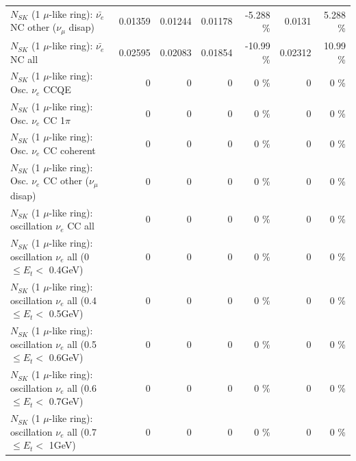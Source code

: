 \begin{table}
\begin{tabular}{| l | r | r | r  r | r  r |}
          $N_{SK}$ (1 $\mu$-like ring): $\bar{\nu_e}$ NC other ($\nu_\mu$ disap) &         0.01359 &         0.01244 &         0.01178 &   -5.288 \%  &          0.0131 &    5.288 \%  \\ 
                            $N_{SK}$ (1 $\mu$-like ring): $\bar{\nu_{e}}$ NC all &         0.02595 &         0.02083 &         0.01854 &   -10.99 \%  &         0.02312 &    10.99 \%  \\ 
\hline
\hline
\hline
                                 $N_{SK}$ (1 $\mu$-like ring): Osc. $\nu_e$ CCQE &               0 &               0 &               0 &        0 \%  &               0 &        0 \%  \\ 
                            $N_{SK}$ (1 $\mu$-like ring): Osc. $\nu_e$ CC 1$\pi$ &               0 &               0 &               0 &        0 \%  &               0 &        0 \%  \\ 
                          $N_{SK}$ (1 $\mu$-like ring): Osc. $\nu_e$ CC coherent &               0 &               0 &               0 &        0 \%  &               0 &        0 \%  \\ 
           $N_{SK}$ (1 $\mu$-like ring): Osc. $\nu_e$ CC other ($\nu_\mu$ disap) &               0 &               0 &               0 &        0 \%  &               0 &        0 \%  \\ 
                        $N_{SK}$ (1 $\mu$-like ring): oscillation $\nu_e$ CC all &               0 &               0 &               0 &        0 \%  &               0 &        0 \%  \\ 
\hline
$N_{SK}$ (1 $\mu$-like ring): oscillation $\nu_{e}$ all (0 $\leq E_{t} <$ 0.4GeV) &               0 &               0 &               0 &        0 \%  &               0 &        0 \%  \\ 
$N_{SK}$ (1 $\mu$-like ring): oscillation $\nu_{e}$ all (0.4 $\leq E_{t} <$ 0.5GeV) &               0 &               0 &               0 &        0 \%  &               0 &        0 \%  \\ 
$N_{SK}$ (1 $\mu$-like ring): oscillation $\nu_{e}$ all (0.5 $\leq E_{t} <$ 0.6GeV) &               0 &               0 &               0 &        0 \%  &               0 &        0 \%  \\ 
$N_{SK}$ (1 $\mu$-like ring): oscillation $\nu_{e}$ all (0.6 $\leq E_{t} <$ 0.7GeV) &               0 &               0 &               0 &        0 \%  &               0 &        0 \%  \\ 
$N_{SK}$ (1 $\mu$-like ring): oscillation $\nu_{e}$ all (0.7 $\leq E_{t} <$ 1GeV) &               0 &               0 &               0 &        0 \%  &               0 &        0 \%  \\ 

\end{tabular}
\end{table}

